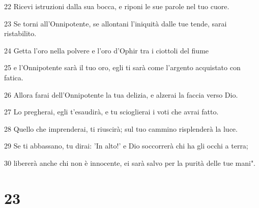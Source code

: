 \par 22 Ricevi istruzioni dalla sua bocca, e riponi le sue parole nel tuo cuore.
\par 23 Se torni all'Onnipotente, se allontani l'iniquità dalle tue tende, sarai ristabilito.
\par 24 Getta l'oro nella polvere e l'oro d'Ophir tra i ciottoli del fiume
\par 25 e l'Onnipotente sarà il tuo oro, egli ti sarà come l'argento acquistato con fatica.
\par 26 Allora farai dell'Onnipotente la tua delizia, e alzerai la faccia verso Dio.
\par 27 Lo pregherai, egli t'esaudirà, e tu scioglierai i voti che avrai fatto.
\par 28 Quello che imprenderai, ti riuscirà; sul tuo cammino risplenderà la luce.
\par 29 Se ti abbassano, tu dirai: 'In alto!' e Dio soccorrerà chi ha gli occhi a terra;
\par 30 libererà anche chi non è innocente, ei sarà salvo per la purità delle tue mani".

\chapter{23}

